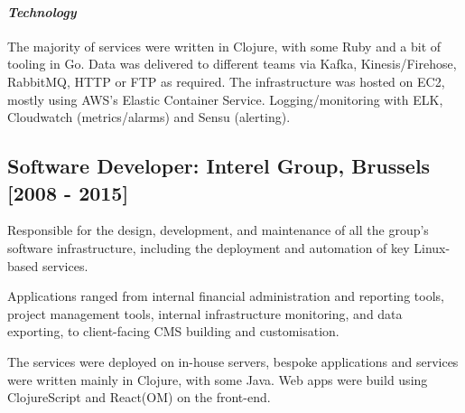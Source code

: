 \documentclass{article}
\begin{document}
\paragraph*{\emph{Technology}}

The majority of services were written in Clojure, with some Ruby and a bit of
tooling in Go. Data was delivered to different teams via Kafka,
Kinesis/Firehose, RabbitMQ, HTTP or FTP as required. The infrastructure was
hosted on EC2, mostly using AWS's Elastic Container Service. Logging/monitoring
with ELK, Cloudwatch (metrics/alarms) and Sensu (alerting).
\subsection*{Software Developer: Interel Group, Brussels [2008 - 2015]}

Responsible for the design, development, and maintenance of all the group's
software infrastructure, including the deployment and automation of key
Linux-based services.

Applications ranged from internal financial administration and reporting tools,
project management tools, internal infrastructure monitoring, and data
exporting, to client-facing CMS building and customisation.

The services were deployed on in-house servers, bespoke applications and
services were written mainly in Clojure, with some Java. Web apps were build
using ClojureScript and React(OM) on the front-end.
\end{document}
